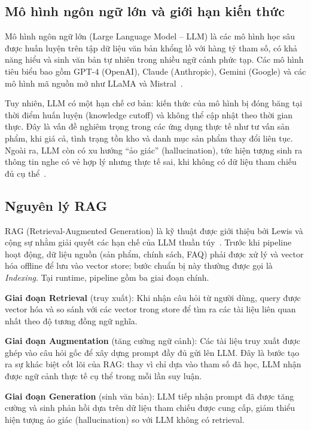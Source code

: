 \subsection{Mô hình ngôn ngữ lớn và giới hạn kiến thức}

Mô hình ngôn ngữ lớn (Large Language Model -- LLM) là các mô hình học sâu được huấn luyện trên tập dữ liệu văn bản khổng lồ với hàng tỷ tham số, có khả năng hiểu và sinh văn bản tự nhiên trong nhiều ngữ cảnh phức tạp. Các mô hình tiêu biểu bao gồm GPT-4 (OpenAI), Claude (Anthropic), Gemini (Google) và các mô hình mã nguồn mở như LLaMA và Mistral~\cite{brown2020language}.

Tuy nhiên, LLM có một hạn chế cơ bản: kiến thức của mô hình bị đóng băng tại thời điểm huấn luyện (knowledge cutoff) và không thể cập nhật theo thời gian thực. Đây là vấn đề nghiêm trọng trong các ứng dụng thực tế như tư vấn sản phẩm, khi giá cả, tình trạng tồn kho và danh mục sản phẩm thay đổi liên tục. Ngoài ra, LLM còn có xu hướng ``ảo giác'' (hallucination), tức hiện tượng sinh ra thông tin nghe có vẻ hợp lý nhưng thực tế sai, khi không có dữ liệu tham chiếu đủ cụ thể~\cite{ji2023survey}.

\subsection{Nguyên lý RAG}

RAG (Retrieval-Augmented Generation) là kỹ thuật được giới thiệu bởi Lewis và cộng sự nhằm giải quyết các hạn chế của LLM thuần túy~\cite{lewis2020rag}. Trước khi pipeline hoạt động, dữ liệu nguồn (sản phẩm, chính sách, FAQ) phải được xử lý và vector hóa offline để lưu vào vector store; bước chuẩn bị này thường được gọi là \textit{Indexing}. Tại runtime, pipeline gồm ba giai đoạn chính.

\textbf{Giai đoạn Retrieval} (truy xuất): Khi nhận câu hỏi từ người dùng, query được vector hóa và so sánh với các vector trong store để tìm ra các tài liệu liên quan nhất theo độ tương đồng ngữ nghĩa.

\textbf{Giai đoạn Augmentation} (tăng cường ngữ cảnh): Các tài liệu truy xuất được ghép vào câu hỏi gốc để xây dựng prompt đầy đủ gửi lên LLM. Đây là bước tạo ra sự khác biệt cốt lõi của RAG: thay vì chỉ dựa vào tham số đã học, LLM nhận được ngữ cảnh thực tế cụ thể trong mỗi lần suy luận.

\textbf{Giai đoạn Generation} (sinh văn bản): LLM tiếp nhận prompt đã được tăng cường và sinh phản hồi dựa trên dữ liệu tham chiếu được cung cấp, giảm thiểu hiện tượng ảo giác (hallucination) so với LLM không có retrieval.

